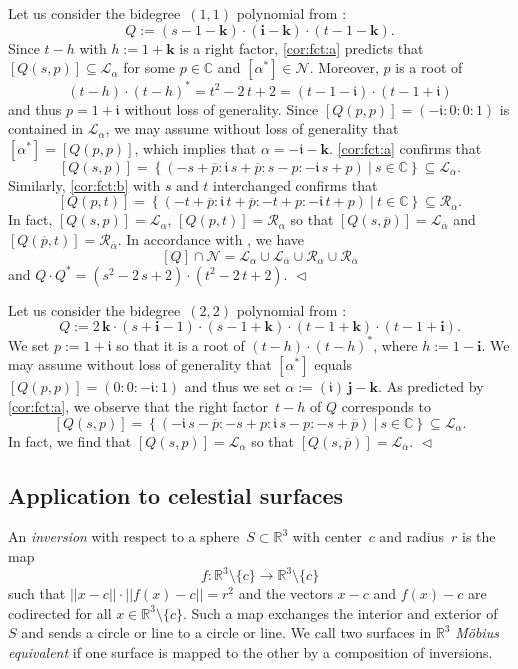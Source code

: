 \documentclass[11pt]{article}
\newcommand{\C}{\mathbb{C}}
\newcommand{\R}{\mathbb{R}}
\newcommand{\cN}{\mathcal{N}}
\newcommand{\cL}{\mathcal{L}}
\newcommand{\cR}{\mathcal{R}}
\newcommand{\op}{{\overline{p}}}
\newcommand{\oalpha}{{\overline{\alpha}}}
\newcommand{\qi}{\mathbf{i}}
\newcommand{\qj}{\mathbf{j}}
\newcommand{\qk}{\mathbf{k}}
\newcommand{\ii}{\mathfrak{i}}
\renewcommand{\c}{\colon}
\newcommand{\set}[2]{\left\{#1 ~|~ #2\right\}}
\newcommand{\df}{\emph}
\newcommand{\Wlog}{without loss of generality }
\newcommand{\END}{\hfill $\vartriangleleft$}
\begin{document}
\begin{example}
\label{exm:fct3}
Let us consider the bidegree~$(1,1)$ polynomial from :
\[
Q:=(s-1-\qk)\cdot(\qi-\qk)\cdot(t-1-\qk).
\]
Since $t-h$ with $h:=1+\qk$ is a right factor,
\ref{cor:fct:a} predicts that
$[Q(s,p)]\subseteq\cL_\alpha$ for
some $p\in\C$ and $[\alpha^*]\in\cN$.
Moreover, $p$ is a root of
\[
(t-h)\cdot(t-h)^*=t^2 - 2\,t + 2=(t-1-\ii)\cdot(t-1+\ii)
\]
and thus $p=1+\ii$ without loss of generality.
Since $[Q(p,p)]=(-\ii:0:0:1)$ is contained in $\cL_\alpha$,
we may assume \Wlog that $[\alpha^*]=[Q(p,p)]$, which
implies that $\alpha=-\ii-\qk$.
\ref{cor:fct:a} confirms that
\[
[Q(s,p)]=\set{(-s+\op:\ii\,s+\op:s-p:-\ii\,s+p)}{s\in\C}\subseteq\cL_\alpha.
\]
Similarly, \ref{cor:fct:b} with $s$ and $t$ interchanged confirms that
\[
[Q(p,t)]=\set{(-t+\op:\ii\,t+\op:-t+p:-\ii\,t+p)}{t\in\C}\subseteq\cR_\alpha.
\]
In fact, $[Q(s,p)]=\cL_\alpha$, $[Q(p,t)]=\cR_\alpha$
so that $[Q(s,\op)]=\cL_\oalpha$ and $[Q(\op,t)]=\cR_\oalpha$.
In accordance with , we have
\[
[Q]\cap\cN=\cL_\alpha\cup\cL_\oalpha\cup\cR_\alpha\cup\cR_\oalpha
\]
and
$
Q\cdot Q^*=(s^2 - 2\,s + 2)\cdot (t^2 - 2\,t + 2).
$
\END
\end{example}

\begin{example}
\label{exm:fct4}
Let us consider the bidegree~$(2,2)$ polynomial from :
\[
Q:=2\,\qk\cdot(s+\qi-1)\cdot(s-1+\qk)\cdot(t-1+\qk)\cdot(t-1+\qi).
\]
We set $p:=1+\ii$ so that it is a root of $(t-h)\cdot (t-h)^*$, where $h:=1-\qi$.
We may assume \Wlog that $[\alpha^*]$ equals $[Q(p,p)]=(0:0:-\ii:1)$
and thus we set $\alpha:=(\ii)\,\qj-\qk$.
As predicted by \ref{cor:fct:a}, we observe that the right factor~$t-h$ of $Q$ corresponds
to
\[
[Q(s,p)]=\set{
(
-\ii\,s-\op:
-s+p:
\ii\,s-p:
-s+\op
)
}{s\in\C}
\subseteq \cL_\alpha.
\]
In fact, we find that
$[Q(s,p)]=\cL_\alpha$
so that $[Q(s,\op)]=\cL_\oalpha$.
\END
\end{example}



\subsection{Application to celestial surfaces}
\label{sec:c}
An \df{inversion} with respect to a sphere~$S\subset \R^3$
with center~$c$ and radius~$r$ is the
map
\[
f\c \R^3\setminus\{c\}\to\R^3\setminus\{c\}
\]
such that $||x-c||\cdot ||f(x)-c||=r^2$ and the vectors $x-c$
and $f(x)-c$ are codirected for all $x\in \R^3\setminus\{c\}$.
Such a map exchanges the interior and exterior of~$S$
and sends a circle or line to a circle or line.
We call two surfaces in $\R^3$ \df{M\"obius equivalent} if
one surface is mapped to the other by a composition of inversions.
\end{document}
